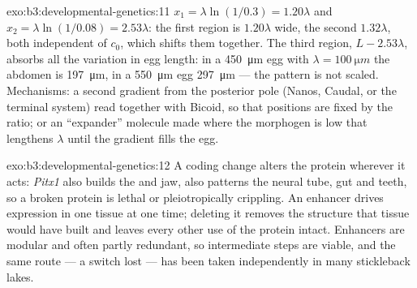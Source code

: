 \begin{solution}{exo:b3:developmental-genetics:11}
$x_{1} = \lambda\ln(1/0.3) = 1.20\lambda$ and $x_{2} = \lambda\ln(1/0.08)
= 2.53\lambda$: the first region is $1.20\lambda$ wide, the second
$1.32\lambda$, both independent of $c_{0}$, which shifts them together.
The third region, $L - 2.53\lambda$, absorbs all the variation in egg
length: in a \qty{450}{\micro m} egg with $\lambda = \qty{100}{\micro m}$
the abdomen is \qty{197}{\micro m}, in a \qty{550}{\micro m} egg
\qty{297}{\micro m} --- the pattern is not scaled. Mechanisms: a second
gradient from the posterior pole (Nanos, Caudal, or the terminal
system) read together with Bicoid, so that positions are fixed by the
ratio; or an ``expander'' molecule made where the morphogen is low that
lengthens $\lambda$ until the gradient fills the egg.
\end{solution}

\begin{solution}{exo:b3:developmental-genetics:12}
A coding change alters the protein wherever it acts: \emph{Pitx1} also
builds the  and jaw, \emph{} also patterns the
neural tube, gut and teeth, so a broken protein is lethal or
pleiotropically crippling. An enhancer drives expression in one tissue
at one time; deleting it removes the structure that tissue would have
built and leaves every other use of the protein intact. Enhancers are
modular and often partly redundant, so intermediate steps are viable,
and the same route --- a switch lost --- has been taken independently in
many stickleback lakes.
\end{solution}

